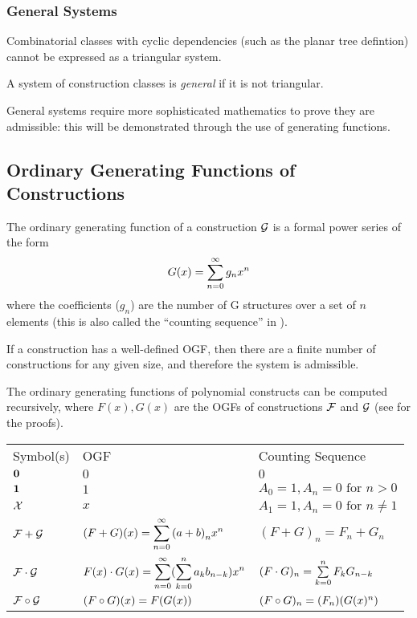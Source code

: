 \subsubsection{General Systems}
Combinatorial classes with cyclic dependencies (such as the planar tree defintion)
cannot be expressed as a triangular system.

\begin{df}
A system of construction classes is \emph{general} if it is not triangular.
\end{df}
\noindent
General systems require more sophisticated mathematics to prove they are admissible:
this will be demonstrated through the use of generating functions.

\subsection{Ordinary Generating Functions of Constructions}

\begin{df}
The ordinary generating function of a construction $\mathcal{G}$ is a formal power series of the form 
$$ G(x) = \sum_{{n} = 0}^{\infty} {g}_{n} x^{n} $$
where the coefficients ($g_n$) are the number of G structures over a set of $n$ elements
(this is also called the ``counting sequence'' in \cite{FlajoletSedgewick2009}).
\end{df}
\noindent
If a construction has a well-defined OGF,
then there are a finite number of constructions for any given size,
and therefore the system is admissible.

The ordinary generating functions of polynomial constructs can be computed recursively,
where  $F(x), G(x)$ are the OGFs of constructions $\mathcal{F}$ and $\mathcal{G}$
(see \cite{FlajoletSedgewick2009}  for the proofs).

\begin{tabular}[b]{lll}\label{countseq}
Symbol(s)& OGF  & Counting Sequence  \\
$\mathbf{0}$ & $0$ & $0$ \\
$\mathbf{1}$ & $1$ & $A_{0} = 1, A_{n} = 0 \text{ for } n > 0$ \\
$\mathcal{X}$ & $x$ & $A_{1} = 1, A_{n} = 0  \text{ for }  n \neq 1$ \\
$\mathcal{F} + \mathcal{G}$ & $ (F + G)(x) = \displaystyle{\ensuremath{\sum_{{n} = 0}^{\infty} {(a+b)}_{n} x^{n}}}$ &  $(F + G)_{n} = F_{n} + G_{n} $ \\
$\mathcal{F} \cdot \mathcal{G}$ & 
                   $F(x) \cdot G(x) = \displaystyle{\sum_{n=0}^{\infty} (\sum_{k=0}^{n} a_k b_{n-k}) x^n}$ &  
                   $ (F \cdot G)_{n} = \sum\limits_{k=0}^{n} F_{k} G_{n-k} $ \\
$\mathcal{F} \circ \mathcal{G}$  & $(F \circ G)(x) = F(G(x))$ & $(F \circ G)_n = (F_{n}) ( G(x)^n )$
\end{tabular}

